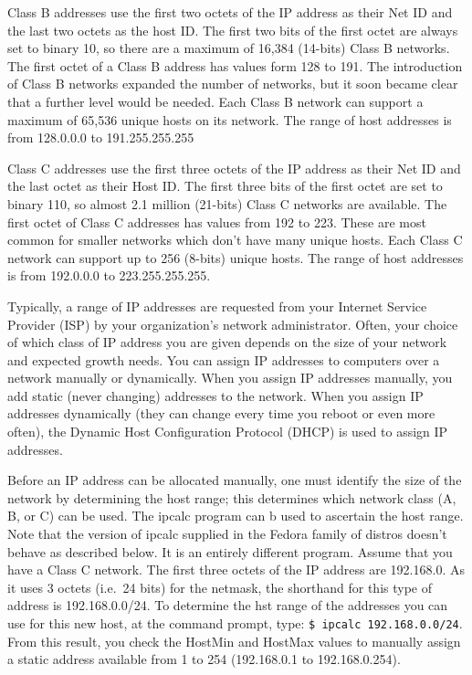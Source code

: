 Class B addresses use the first two octets of the IP address as their
Net ID and the last two octets as the host ID. The first two bits of the
first octet are always set to binary 10, so there are a maximum of
16,384 (14-bits) Class B networks. The first octet of a Class B address
has values form 128 to 191. The introduction of Class B networks
expanded the number of networks, but it soon became clear that a further
level would be needed. Each Class B network can support a maximum of
65,536 unique hosts on its network. The range of host addresses is from
128.0.0.0 to 191.255.255.255

Class C addresses use the first three octets of the IP address as their
Net ID and the last octet as their Host ID. The first three bits of the
first octet are set to binary 110, so almost 2.1 million (21-bits) Class
C networks are available. The first octet of Class C addresses has
values from 192 to 223. These are most common for smaller networks which
don't have many unique hosts. Each Class C network can support up to 256
(8-bits) unique hosts. The range of host addresses is from 192.0.0.0 to
223.255.255.255.

Typically, a range of IP addresses are requested from your Internet
Service Provider (ISP) by your organization's network administrator.
Often, your choice of which class of IP address you are given depends on
the size of your network and expected growth needs. You can assign IP
addresses to computers over a network manually or dynamically. When you
assign IP addresses manually, you add static (never changing) addresses
to the network. When you assign IP addresses dynamically (they can
change every time you reboot or even more often), the Dynamic Host
Configuration Protocol (DHCP) is used to assign IP addresses.

Before an IP address can be allocated manually, one must identify the
size of the network by determining the host range; this determines which
network class (A, B, or C) can be used. The ipcalc program can b used to
ascertain the host range. Note that the version of ipcalc supplied in
the Fedora family of distros doesn't behave as described below. It is an
entirely different program. Assume that you have a Class C network. The
first three octets of the IP address are 192.168.0. As it uses 3 octets
(i.e.~24 bits) for the netmask, the shorthand for this type of address
is 192.168.0.0/24. To determine the hst range of the addresses you can
use for this new host, at the command prompt, type:
\texttt{\$ ipcalc 192.168.0.0/24}. From this result, you check the
HostMin and HostMax values to manually assign a static address available
from 1 to 254 (192.168.0.1 to 192.168.0.254).

